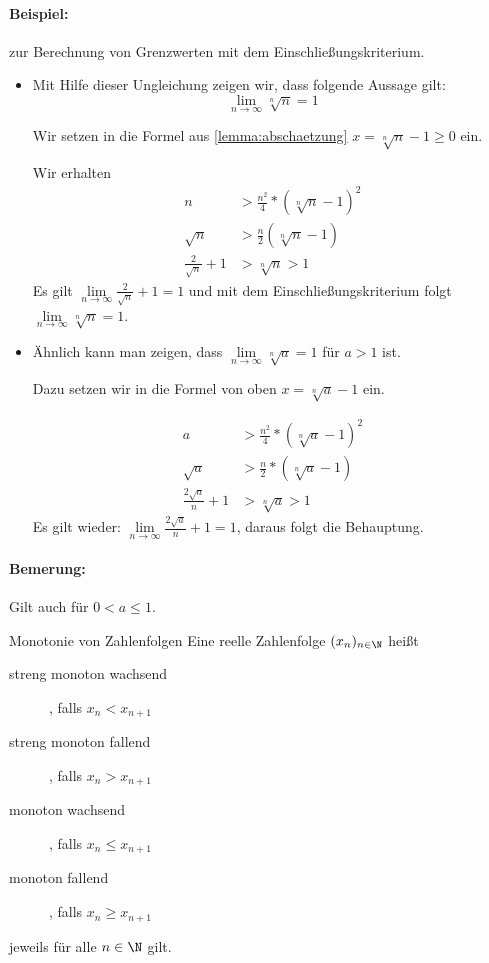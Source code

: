 \paragraph{Beispiel:} zur Berechnung von Grenzwerten mit dem Einschließungskriterium.
\begin{itemize}
	\item Mit Hilfe dieser Ungleichung zeigen wir, dass folgende Aussage gilt:
	$$\lim\limits_{n\to\infty}\sqrt[n]{n}=1$$

	Wir setzen in die Formel aus \autoref{lemma:abschaetzung} $x=\sqrt[n]{n}-1\geq 0$ ein.

	Wir erhalten
	\begin{align*}
		n&>\frac{n^2}{4}*(\sqrt[n]{n}-1)^2\\
		\sqrt{n}&>\frac n2(\sqrt[n]{n}-1)\\
		\frac2{\sqrt{n}}+1&>\sqrt[n]{n}>1
	\end{align*}
	Es gilt $\lim\limits_{n\to\infty}\frac2{\sqrt{n}}+1 = 1$ und mit dem Einschließungskriterium folgt $\lim\limits_{n\to\infty}\sqrt[n]{n}=1$.

	\item Ähnlich kann man zeigen, dass $\lim\limits_{n\to\infty}\sqrt[n]{a}=1$ für $a>1$ ist.

	Dazu setzen wir in die Formel von oben $x=\sqrt[n]{a}-1$ ein.

	\begin{align*}
		a&>\frac{n^2}{4}*(\sqrt[n]{a}-1)^2\\
		\sqrt{a}&>\frac n2*(\sqrt[n]{a}-1)\\
		\frac{2\sqrt{a}}{n}+1&>\sqrt[n]{a}>1
	\end{align*}
	Es gilt wieder: $\lim\limits_{n\to\infty}\frac{2\sqrt{a}}{n}+1=1$, daraus folgt die Behauptung.
\end{itemize}

\paragraph{Bemerung:} Gilt auch für $0<a\leq 1$.

\begin{definition}{Monotonie von Zahlenfolgen}
	Eine reelle Zahlenfolge $(x_n)_{n\in\N}$ heißt
	\begin{description}
		\item[streng monoton wachsend], falls $x_n<x_{n+1}$
		\item[streng monoton fallend], falls $x_n>x_{n+1}$
		\item[monoton wachsend], falls $x_n\leq x_{n+1}$
		\item[monoton fallend], falls $x_n\geq x_{n+1}$
	\end{description}
	jeweils für alle $n\in\N$ gilt.
\end{definition}

